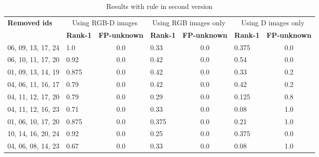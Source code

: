 \documentclass{article}
\begin{document}
\begin{table}[]
	\begin{adjustwidth}{-.75in}{-.75in}
		\centering
		\caption{Results with rule in second version}
		\label{tab:results-beta}
		\begin{tabular}{|l|l|c|l|c|l|c|}
			\hline
			\multirow{2}{*}{\bf Removed ids} & \multicolumn{2}{c|}{Using RGB-D images} &\multicolumn{2}{c|}{Using RGB images only} &\multicolumn{2}{c|}{Using D images only} \\ \cline{2-7}
							 & \bf Rank-1 & \bf FP-unknown            & \bf Rank-1 & \bf FP-unknown              & \bf Rank-1 & \bf FP-unknown  \\ \hline

			06, 09, 13, 17, 24               & 1.0        & 0.0                       & 0.33       & 0.0                         & 0.375      & 0.0\\ \hline

			06, 10, 11, 17, 20               & 0.92       & 0.0                       & 0.42       & 0.0                         & 0.54       & 0.0\\ \hline

			01, 09, 13, 14, 19               & 0.875      & 0.0                       & 0.42       & 0.0                         & 0.33       & 0.2\\ \hline

			04, 06, 11, 16, 17               & 0.79       & 0.0                       & 0.42       & 0.0                         & 0.42       & 0.2\\ \hline

			04, 11, 12, 17, 20               & 0.79       & 0.0                       & 0.29       & 0.0                         & 0.125      & 0.8\\ \hline

			04, 11, 12, 16, 23               & 0.71       & 0.0                       & 0.33       & 0.0                         & 0.08       & 1.0\\ \hline

			01, 06, 10, 17, 20               & 0.875      & 0.0                       & 0.375      & 0.0                         & 0.21       & 1.0\\ \hline

			10, 14, 16, 20, 24               & 0.92       & 0.0                       & 0.25       & 0.0                         & 0.375      & 0.0\\ \hline

			04, 06, 08, 14, 23               & 0.67       & 0.0                       & 0.33       & 0.0                         & 0.08       & 1.0\\ \hline


\end{tabular}
\end{adjustwidth}
\end{table}
\end{document}

